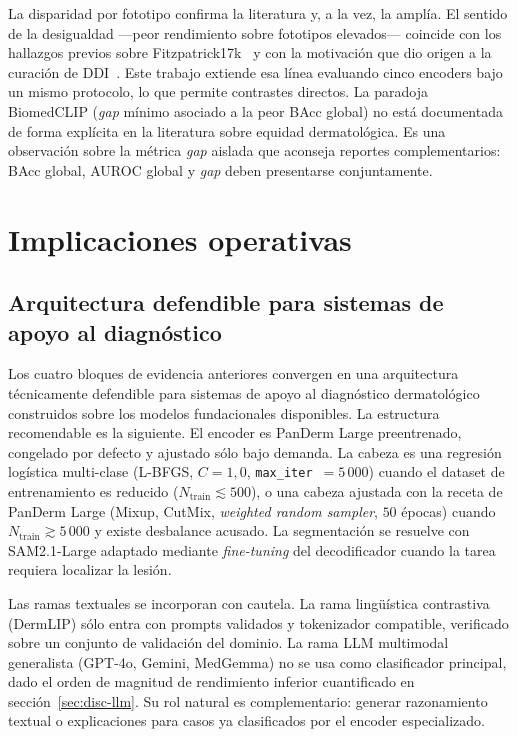 La disparidad por fototipo confirma la literatura y, a la vez, la
amplía. El sentido de la desigualdad ---peor rendimiento sobre
fototipos elevados--- coincide con los hallazgos previos sobre
Fitzpatrick17k~\cite{fitzpatrick17k} y con la motivación que dio
origen a la curación de DDI~\cite{ddi}. Este trabajo extiende esa
línea evaluando cinco encoders bajo un mismo protocolo, lo que
permite contrastes directos. La paradoja BiomedCLIP (\emph{gap}
mínimo asociado a la peor BAcc global) no está documentada de forma
explícita en la literatura sobre equidad dermatológica. Es una
observación sobre la métrica \emph{gap} aislada que aconseja
reportes complementarios: BAcc global, AUROC global y \emph{gap}
deben presentarse conjuntamente.

\section{Implicaciones operativas}
\label{sec:implicaciones}

\subsection{Arquitectura defendible para sistemas de apoyo al diagnóstico}
\label{sec:disc-arq}

Los cuatro bloques de evidencia anteriores convergen en una
arquitectura técnicamente defendible para sistemas de apoyo al
diagnóstico dermatológico construidos sobre los modelos
fundacionales disponibles. La estructura recomendable es la
siguiente. El encoder es PanDerm Large preentrenado, congelado por
defecto y ajustado sólo bajo demanda. La cabeza es una regresión
logística multi-clase (L-BFGS, $C=1{,}0$,
\texttt{max\_iter}~$=5\,000$) cuando el dataset de entrenamiento es
reducido ($N_{\mathrm{train}} \lesssim 500$), o una cabeza
ajustada con la receta de PanDerm Large (Mixup, CutMix,
\emph{weighted random sampler}, $50$ épocas) cuando
$N_{\mathrm{train}} \gtrsim 5\,000$ y existe desbalance acusado.
La segmentación se resuelve con SAM2.1-Large adaptado mediante
\emph{fine-tuning} del decodificador cuando la tarea requiera
localizar la lesión.

Las ramas textuales se incorporan con cautela. La rama lingüística
contrastiva (DermLIP) sólo entra con prompts validados y tokenizador
compatible, verificado sobre un conjunto de validación del dominio.
La rama LLM multimodal generalista (GPT-4o, Gemini, MedGemma) no se
usa como clasificador principal, dado el orden de magnitud de
rendimiento inferior cuantificado en sección~\ref{sec:disc-llm}.
Su rol natural es complementario: generar razonamiento textual o
explicaciones para casos ya clasificados por el encoder
especializado.

